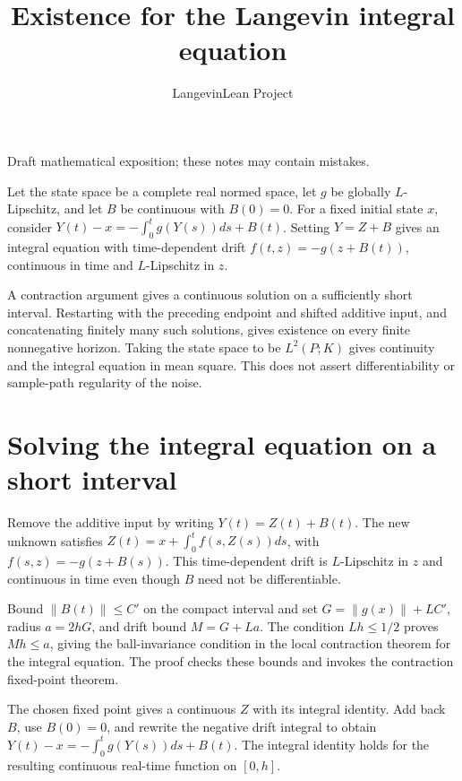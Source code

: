 \documentclass[11pt,a4paper]{article}
\title{\texorpdfstring{Existence for the Langevin integral equation}{Existence for the Langevin integral equation}}
\author{LangevinLean Project}
\date{}
\begin{document}
\maketitle
Draft mathematical exposition; these notes may contain mistakes.


Let the state space be a complete real normed space, let \(g\) be globally \(L\)-Lipschitz, and let \(B\) be continuous with \(B(0)=0\). For a fixed initial state \(x\), consider \(Y(t)-x=-\int_0^tg(Y(s))ds+B(t)\). Setting \(Y=Z+B\) gives an integral equation with time-dependent drift \(f(t,z)=-g(z+B(t))\), continuous in time and \(L\)-Lipschitz in \(z\).



A contraction argument gives a continuous solution on a sufficiently short interval. Restarting with the preceding endpoint and shifted additive input, and concatenating finitely many such solutions, gives existence on every finite nonnegative horizon. Taking the state space to be \(L^2(P;K)\) gives continuity and the integral equation in mean square. This does not assert differentiability or sample-path regularity of the noise.


\section{\texorpdfstring{Solving the integral equation on a short interval}{Solving the integral equation on a short interval}}


Remove the additive input by writing \(Y(t)=Z(t)+B(t)\). The new unknown satisfies \(Z(t)=x+\int_0^t f(s,Z(s))ds\), with \(f(s,z)=-g(z+B(s))\). This time-dependent drift is \(L\)-Lipschitz in \(z\) and continuous in time even though \(B\) need not be differentiable.



Bound \(\|B(t)\|\le C'\) on the compact interval and set \(G=\|g(x)\|+LC'\), radius \(a=2hG\), and drift bound \(M=G+La\). The condition \(Lh\le1/2\) proves \(Mh\le a\), giving the ball-invariance condition in the local contraction theorem for the integral equation. The proof checks these bounds and invokes the contraction fixed-point theorem.



The chosen fixed point gives a continuous \(Z\) with its integral identity. Add back \(B\), use \(B(0)=0\), and rewrite the negative drift integral to obtain \(Y(t)-x=-\int_0^tg(Y(s))ds+B(t)\). The integral identity holds for the resulting continuous real-time function on \([0,h]\).
\end{document}
